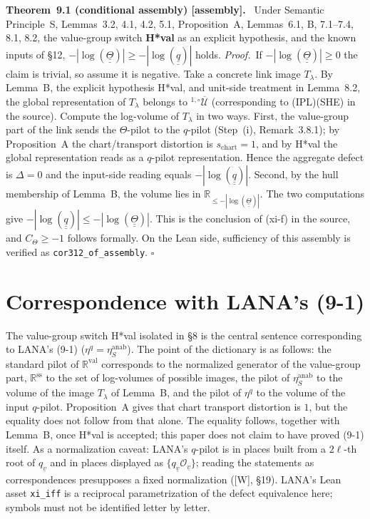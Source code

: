 \documentclass[11pt]{article}
\newcommand{\cO}{\mathcal O}
\newcommand{\cU}{\mathcal U}
\newcommand{\uu}[1]{\underline{\underline{#1}}}
\newcommand{\stmt}[2]{\medskip\noindent\textbf{#1\ #2.}\ }
\newcommand{\pf}{\medskip\noindent\textit{Proof.}\ }
\newcommand{\qedh}{\hfill\(\square\)\par\medskip}
\begin{document}
\stmt{Theorem}{9.1 (conditional assembly) [assembly]}
Under Semantic Principle~S, Lemmas~3.2, 4.1, 4.2, 5.1,
Proposition~A, Lemmas~6.1, B, 7.1--7.4, 8.1, 8.2, the value-group
switch \textbf{H*val} as an explicit hypothesis, and the known
inputs of \S12,
$-|\log(\uu\Theta)|\ge-|\log(\uu q)|$ holds.
\pf If $-|\log(\uu\Theta)|\ge0$ the claim is trivial, so assume it
is negative.  Take a concrete link image $T_\lambda$.  By Lemma~B,
the explicit hypothesis H*val, and unit-side treatment in
Lemma~8.2, the global representation of $T_\lambda$ belongs to
${}^{1,\circ}\overline{\cU}$ (corresponding to (IPL)(SHE) in the
source).  Compute the log-volume of $T_\lambda$ in two ways.
First, the value-group part of the link sends the $\Theta$-pilot to
the $q$-pilot (Step~(i), Remark~3.8.1); by Proposition~A the
chart/transport distortion is $s_{\mathrm{chart}}=1$, and by H*val
the global representation reads as a $q$-pilot representation.
Hence the aggregate defect is $\Delta=0$ and the input-side reading
equals $-|\log(\uu q)|$.  Second, by the hull membership of
Lemma~B, the volume lies in
$\mathbb R_{\le-|\log(\uu\Theta)|}$.  The two computations give
$-|\log(\uu q)|\le-|\log(\uu\Theta)|$.  This is the conclusion of
(xi-f) in the source, and $C_{\Theta}\ge-1$ follows formally.  On
the Lean side, sufficiency of this assembly is verified as
\texttt{cor312\_of\_assembly}. \qedh

\section{Correspondence with LANA's (9-1)}

The value-group switch H*val isolated in \S8 is the central
sentence corresponding to LANA's (9-1)
($\eta^{q}=\eta^{\mathrm{anab}}_{S}$).  The point of the dictionary
is as follows: the standard pilot of $\mathbb R^{\mathrm{val}}$
corresponds to the normalized generator of the value-group part,
$\mathbb R^{\mathrm{ss}}$ to the set of log-volumes of possible
images, the pilot of $\eta^{\mathrm{anab}}_{S}$ to the volume of
the image $T_\lambda$ of Lemma~B, and the pilot of $\eta^{q}$ to
the volume of the input $q$-pilot.  Proposition~A gives that chart
transport distortion is $1$, but the equality does not follow from
that alone.  The equality follows, together with Lemma~B, once
H*val is accepted; this paper does not claim to have proved (9-1)
itself.  As a normalization caveat: LANA's $q$-pilot is in places
built from a $2\ell$-th root of $q_{\underline v}$ and in places
displayed as $\{q_{\underline v}\cO_{\underline v}\}$; reading the
statements as correspondences presupposes a fixed normalization
([W], \S19).  LANA's Lean asset \texttt{xi\_iff} is a reciprocal
parametrization of the defect equivalence here; symbols must not be
identified letter by letter.
\end{document}
